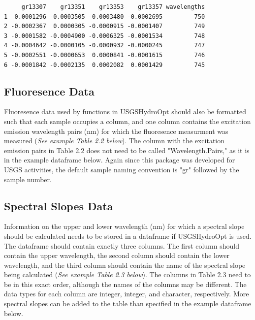 \documentclass[a4paper,11pt]{article}\usepackage[]{graphicx}\usepackage[]{color}
\makeatletter
\newenvironment{kframe}{%
 \def\at@end@of@kframe{}%
 \ifinner\ifhmode%
  \def\at@end@of@kframe{\end{minipage}}%
  \begin{minipage}{\columnwidth}%
 \fi\fi%
 \def\FrameCommand##1{\hskip\@totalleftmargin \hskip-\fboxsep
 \colorbox{shadecolor}{##1}\hskip-\fboxsep
     \hskip-\linewidth \hskip-\@totalleftmargin \hskip\columnwidth}%
 \MakeFramed {\advance\hsize-\width
   \@totalleftmargin\z@ \linewidth\hsize
   \@setminipage}}%
 {\par\unskip\endMakeFramed%
 \at@end@of@kframe}
\newenvironment{knitrout}{}{} %
\makeatother
\begin{document}
\begin{knitrout}
\color{fgcolor}\begin{kframe}
\begin{verbatim}
     gr13307    gr13351    gr13353    gr13357 wavelengths
1  0.0001296 -0.0003505 -0.0003480 -0.0002695         750
2 -0.0002367  0.0000305 -0.0000915 -0.0001407         749
3 -0.0001582 -0.0004900 -0.0006325 -0.0001534         748
4 -0.0004642 -0.0000105 -0.0000932 -0.0000245         747
5 -0.0002551 -0.0000653  0.0000841 -0.0001615         746
6 -0.0001842 -0.0002135  0.0002082  0.0001429         745
\end{verbatim}
\end{kframe}
\end{knitrout}

\subsection{Fluoresence Data}
Fluoresence data used by functions in USGSHydroOpt should also be formatted such that each sample occupies a column, and one column contains the excitation emission wavelength pairs (nm) for which the fluoresence measurment was measured (\emph{See example Table 2.2 below}). The column with the excitation emission pairs in Table 2.2 does not need to be called "Wavelength.Pairs," as it is in the example dataframe below. Again since this package was developed for USGS activities, the default sample naming convention is "gr" followed by the sample number.

\begin{knitrout}
\color{fgcolor}\begin{kframe}


{\ttfamily\noindent\bfseries\color{errorcolor}{Error: object 'dfFluor' not found}}\end{kframe}
\end{knitrout}

\subsection{Spectral Slopes Data}
Information on the upper and lower wavelength (nm) for which a spectral slope should be calculated needs to be stored in a dataframe if USGSHydroOpt is used. The dataframe should contain exactly three columns. The first column should contain the upper wavelength, the second column should contain the lower wavelength, and the third column should contain the name of the spectral slope being calculated (\emph{See example Table 2.3 below}). The columns in Table 2.3 need to be in this exact order, although the names of the columns may be different. The data types for each column are integer, integer, and character, respectively. More spectral slopes can be added to the table than specified in the example dataframe below.
\end{document}
